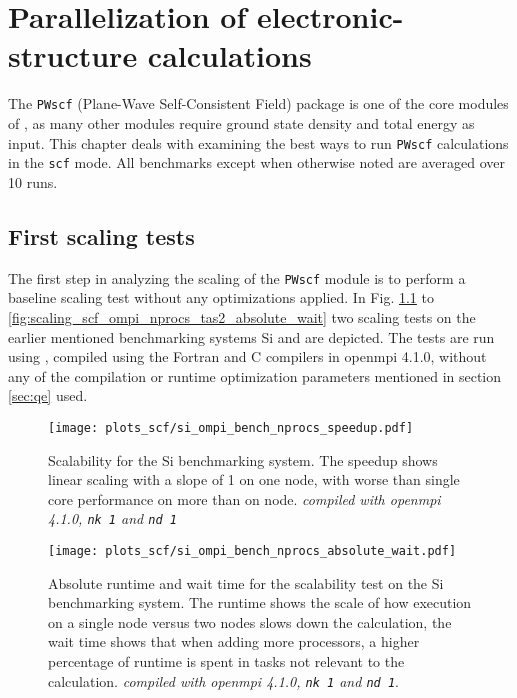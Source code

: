 \documentclass[main.tex]{subfiles}
\begin{document}
\chapter{Parallelization of electronic-structure calculations\label{ch:optimisation_scf}}

The \texttt{PWscf} (Plane-Wave Self-Consistent Field) package is one of the core modules of \QE, as many other modules require ground state density and total energy as input.
This chapter deals with examining the best ways to run \texttt{PWscf} calculations in the \texttt{scf} mode.
All benchmarks except when otherwise noted are averaged over 10 runs.

\section{First scaling tests}\label{sec:scf_first_scaling}

The first step in analyzing the scaling of the \texttt{PWscf} module is to perform a baseline scaling test without any optimizations applied. 
In Fig. \ref{fig:scaling_scf_ompi_nprocs_si_speedup} to \ref{fig:scaling_scf_ompi_nprocs_tas2_absolute_wait} two scaling tests on the earlier mentioned benchmarking systems Si and \TaS are depicted. 
The tests are run using , compiled using the Fortran and C compilers in \gls{openmpi} 4.1.0, without any of the compilation or runtime optimization parameters mentioned in section \ref{sec:qe} used.

\begin{figure}[h!]
\centering
\texttt{[image: plots\_scf/si\_ompi\_bench\_nprocs\_speedup.pdf]}
\caption{Scalability for the Si benchmarking system. The speedup shows linear scaling with a slope of 1 on one node, with worse than single core performance on more than on node. \emph{ compiled with \gls{openmpi} 4.1.0, \texttt{nk 1} and \texttt{nd 1}}}
\label{fig:scaling_scf_ompi_nprocs_si_speedup}
\end{figure}

\begin{figure}[b!]
\centering
\texttt{[image: plots\_scf/si\_ompi\_bench\_nprocs\_absolute\_wait.pdf]}
\caption{Absolute runtime and wait time for the scalability test on the Si benchmarking system. The runtime shows the scale of how execution on a single node versus two nodes slows down the calculation, the wait time shows that when adding more processors, a higher percentage of runtime is spent in tasks not relevant to the calculation. \emph{\QE compiled with \gls{openmpi} 4.1.0, \texttt{nk 1} and \texttt{nd 1}}. }
\label{fig:scaling_scf_ompi_nprocs_si_absolute_wait}
\end{figure}
\end{document}
